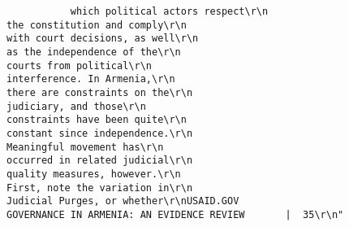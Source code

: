 \documentclass[
]{article}
\begin{document}
\begin{verbatim}
           which political actors respect\r\n                                                                                 the constitution and comply\r\n                                                                                 with court decisions, as well\r\n                                                                                 as the independence of the\r\n                                                                                 courts from political\r\n                                                                                 interference. In Armenia,\r\n                                                                                 there are constraints on the\r\n                                                                                 judiciary, and those\r\n                                                                                 constraints have been quite\r\n                                                                                 constant since independence.\r\n                                                                                 Meaningful movement has\r\n                                                                                 occurred in related judicial\r\n                                                                                 quality measures, however.\r\n                                                                                 First, note the variation in\r\n                                                                                 Judicial Purges, or whether\r\nUSAID.GOV                                                   GOVERNANCE IN ARMENIA: AN EVIDENCE REVIEW       |  35\r\n"

\end{verbatim}
\end{document}
